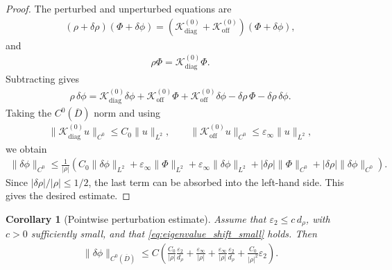\documentclass[10pt]{article}
\numberwithin{equation}{section}
\newtheorem{corollary}{Corollary}[theorem]
\begin{document}
\begin{proof}
The perturbed and unperturbed equations are
\begin{align*}
    (\rho+\delta\rho)(\Phi+\delta\phi)
    =
    (\mathcal{K}_{\mathrm{diag}}^{(0)} + \mathcal{K}_{\mathrm{off}}^{(0)})(\Phi+\delta\phi),
\end{align*}
and
\begin{align*}
    \rho\Phi = \mathcal{K}_{\mathrm{diag}}^{(0)}\Phi.
\end{align*}
Subtracting gives
\begin{align*}
    \rho\,\delta\phi
    =
    \mathcal{K}_{\mathrm{diag}}^{(0)}\delta\phi
    +
    \mathcal{K}_{\mathrm{off}}^{(0)}\Phi
    +
    \mathcal{K}_{\mathrm{off}}^{(0)}\delta\phi
    -
    \delta\rho\,\Phi
    -
    \delta\rho\,\delta\phi.
\end{align*}
Taking the $C^0(\overline D)$ norm and using
\begin{align*}
    \|\mathcal{K}_{\mathrm{diag}}^{(0)}u\|_{C^0}
    \leq
    C_0\|u\|_{L^2},
    \qquad
    \|\mathcal{K}_{\mathrm{off}}^{(0)}u\|_{C^0}
    \leq
    \varepsilon_\infty\|u\|_{L^2},
\end{align*}
we obtain
\begin{align*}
    \|\delta\phi\|_{C^0}
    \leq
    \frac{1}{|\rho|}
    \left(
    C_0\|\delta\phi\|_{L^2}
    +
    \varepsilon_\infty\|\Phi\|_{L^2}
    +
    \varepsilon_\infty\|\delta\phi\|_{L^2}
    +
    |\delta\rho|\|\Phi\|_{C^0}
    +
    |\delta\rho|\|\delta\phi\|_{C^0}
    \right).
\end{align*}
Since $|\delta\rho|/|\rho|\leq 1/2$, the last term can be absorbed into the left-hand side. This gives the desired estimate.
\end{proof}

\begin{corollary}[Pointwise perturbation estimate]
\label{cor:C0_control}
Assume that $\varepsilon_2\leq c\,d_\rho$, with $c>0$ sufficiently small, and that \eqref{eq:eigenvalue_shift_small} holds. Then
\begin{align}
    \|\delta\phi\|_{C^0(\overline D)}
    \leq
    C\left(
    \frac{C_0}{|\rho|}\frac{\varepsilon_2}{d_\rho}
    +
    \frac{\varepsilon_\infty}{|\rho|}
    +
    \frac{\varepsilon_\infty}{|\rho|}\frac{\varepsilon_2}{d_\rho}
    +
    \frac{C_0}{|\rho|^2}\varepsilon_2
    \right).
    \label{eq:C0_control_general}
\end{align}
\end{corollary}
\end{document}
